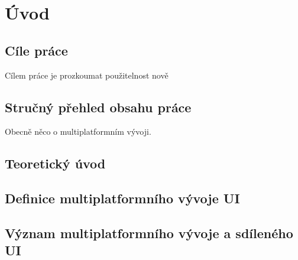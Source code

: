 \chapter{Úvod}
\setcounter{page}{1}


\section{Cíle práce}
Cílem práce je prozkoumat použitelnost nově 


\section{Stručný přehled obsahu práce}

Obecně něco o multiplatformním vývoji.

\section{Teoretický úvod}

\section{Definice multiplatformního vývoje UI}




\section{Význam multiplatformního vývoje a sdíleného UI}

